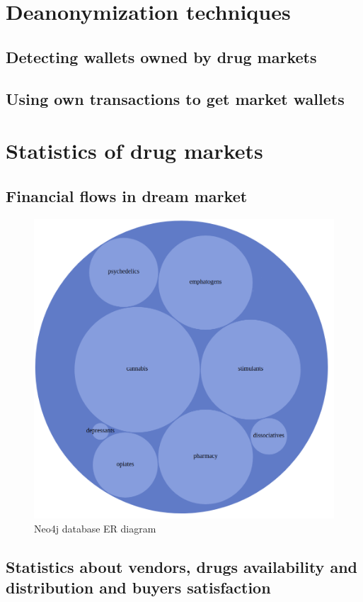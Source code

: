 \documentclass[
  digital, %
  table,   %
  lof,     %
  lot,     %
  oneside
]{fithesis3}
\begin{document}
\chapter{Deanonymization techniques}
\section{Detecting wallets owned by drug markets}
\section{Using own transactions to get market wallets}

\chapter{Statistics of drug markets}
\section{Financial flows in dream market}
\begin{figure}[h]
    \centering
    \includegraphics[width=1\textwidth]{circles}
    \caption{Neo4j database ER diagram}
    \label{neo4jschema}
\end{figure}
\section{Statistics about vendors, drugs availability and distribution and buyers satisfaction}
\end{document}
